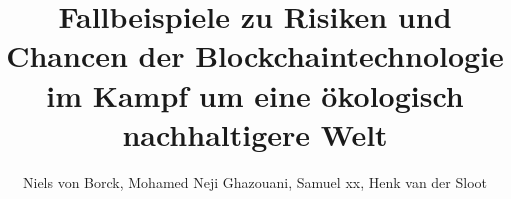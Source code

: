
\usepackage{graphicx}




\secondExaminer{}

%

%


\title{Fallbeispiele zu Risiken und Chancen der Blockchaintechnologie im Kampf um eine ökologisch nachhaltigere Welt}
\author{Niels von Borck, Mohamed Neji Ghazouani, Samuel xx, Henk van der Sloot}

\makeindex[title=Index, options=-s indexstyle.ist, intoc]

\makenoidxglossaries
{}


\maketitle


\tableofcontents \newpage

 \clearpage
 \clearpage
 \clearpage

